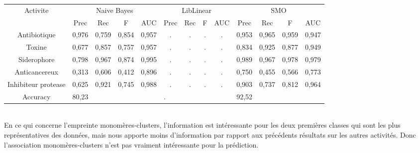 \documentclass[a4paper,10pt]{report}
\begin{document}
	   \begin{flushleft}
	    \leftskip -3cm
	    \begin{tabular}{|c||c|c|c|c||c|c|c|c||c|c|c|c|}\hline
	      {Activite} & \multicolumn{4}{c||}{Naive Bayes} & \multicolumn{4}{c||}{LibLinear} & \multicolumn{4}{c|}{SMO} \\\cline{2-13}
	      & Prec & Rec & F & AUC & Prec & Rec & F & AUC & Prec & Rec & F & AUC \\\hline
	      Antibiotique & 0,976 & 0,759 & 0,854 & 0,957 & . & . & . & . & 0,953 & 0,965 & 0,959 & 0,947 \\\hline
	      Toxine & 0,677  & 0,857 & 0,757 & 0,957 & . & . & . & . & 0,834 & 0,925 & 0,877 & 0,949  \\\hline
	      Siderophore & 0,798 & 0,967 & 0,874 & 0,995 & . & . & . & . & 0,989 & 0,967 & 0,978 & 0,979  \\\hline
	      Anticancereux & 0,313 & 0,606 & 0,412 & 0,896 & . & . & . & . & 0,750 & 0,455 & 0,566 & 0,773 \\\hline
	      Inhibiteur protease & 0,625 & 0,921 & 0,745 & 0,988 & . & . & . & . & 0,903 & 0,737 & 0,812 & 0,964 \\\hline
	      Accuracy & \multicolumn{4}{l||}{80,23} & \multicolumn{4}{l||}{.} & \multicolumn{4}{l|}{92,52} \\\hline
	    \end{tabular}
	     \label{table 4}
	  \end{flushleft}
	  	
	  \\ En ce qui concerne l'empreinte monomères-clusters, l'information est intéressante pour les deux premières classes qui sont les plus représentatives des données, mais nous apporte moins d'information par rapport aux précédents résultats sur les autres activités.
	  Donc l'association monomères-clusters n'est pas vraiment intéressante pour la prédiction.
	  	  
\end{document}
